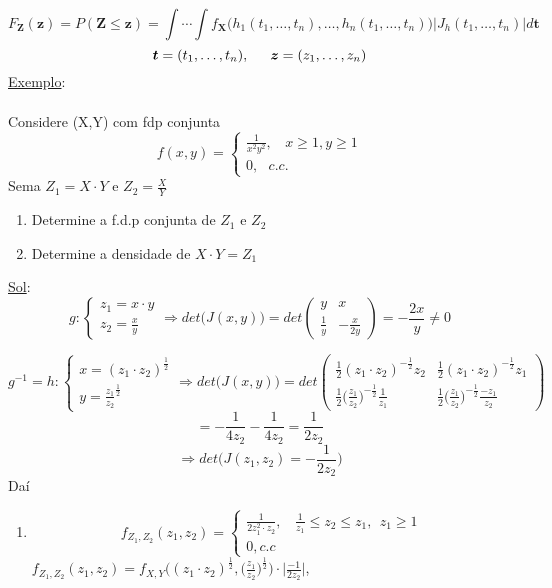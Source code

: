 \documentclass[a4paper,12pt]{article}
\begin{document}
\begin{enumerate}
			 $$F_{\bm Z}(\bm z)=P(\bm Z\le\bm  z) = \int\cdots\int  f_{\bm X}\bigg(
			 h_1(t_1,\ldots,t_n),\ldots,h_n(t_1,\ldots,t_n)
			 \bigg)
			 \bigg|
			 J_h(t_1,\ldots,t_n)
			 \bigg|d\bm t
			 $$
			 $$\bm t=(t_1,\ldots,t_n),\indent \bm z=(z_1,\ldots,z_n) $$
			 \newpage
			 \underline{Exemplo}:\\
			 \\
			 Considere (X,Y) com fdp conjunta
			 $$f(x,y)= \begin{cases}
			 \frac{1}{x^2y^2}, \ \ \ \ x\ge1,y\ge 1\\
			 0, \ \ \ c.c.
			 \end{cases} $$
			 Sema $Z_1=X\cdot Y$ e $Z_2=\frac{X}{Y}$
			 \begin{enumerate}
			 	\item Determine a f.d.p conjunta de $Z_1$ e $Z_2$
			 	\item Determine a densidade de $X\cdot Y=Z_1$
			 \end{enumerate}
		 \underline{Sol}:
		 $$ 
		 g:\begin{cases}
		 z_1=x\cdot y\\
		 z_2=\frac{x}{y}
		 \end{cases}
		 \Rightarrow
		 det\bigg(J(x,y)\bigg)=det\begin{pmatrix}
		 y & x\\
		 \frac{1}{y} & -\frac{x}{2y}
		 \end{pmatrix}=-\frac{2x}{y}\ne 0
		 $$
		 
		 	 $$ 
		 g^{-1}=h:\begin{cases}
		 x=(z_1\cdot z_2)^{\frac{1}{2}}\\
		 y=\frac{z_1}{z_2}^\frac{1}{2}
		 \end{cases}
		 \Rightarrow
		 det\bigg(J(x,y)\bigg)=det\begin{pmatrix}
		 \frac{1}{2}(z_1\cdot z_2)^{-\frac{1}{2}}z_2 &  \frac{1}{2}(z_1\cdot z_2)^{-\frac{1}{2}}z_1\\
		 \frac{1}{2}\bigg(\frac{z_1}{z_2}\bigg)^{-\frac{1}{2}}\frac{1}{z_1} & \frac{1}{2}\bigg(\frac{z_1}{z_2}\bigg)^{-\frac{1}{2}}\frac{-z_1}{z_2} 
		 \end{pmatrix}
		 $$
		 $$=-\frac{1}{4z_2}-\frac{1}{4z_2}=\frac{1}{2z_2} $$
		 $$\Rightarrow det\bigg(
		 J(z_1,z_2)=-\frac{1}{2z_2}
		 \bigg) $$
		 Daí
		 
		 \begin{enumerate}[label=\alph*)]
		 	\item 
		 	$$f_{Z_1,Z_2}(z_1,z_2)= \begin{cases}
		 	\frac{1}{2z_1^2\cdot z_2}, \ \ \ \ \frac{1}{z_1}\le z_2\le z_1, \ \ z_1 \ge 1\\
		 	0,c.c
		 	\end{cases} $$
		 	$f_{Z_1,Z_2}(z_1,z_2)=f_{X,Y}\bigg(
		 	(z_1\cdot z_2)^{\frac{1}{2}},\bigg(\frac{z_1}{z_2}\bigg)^{\frac{1}{2}}
		 	\bigg)\cdot \bigg|
		 	\frac{-1}{2z_2}
		 	\bigg|$,
		 	\\
		 	\\
	

\end{enumerate}
\end{enumerate}
\end{document}
